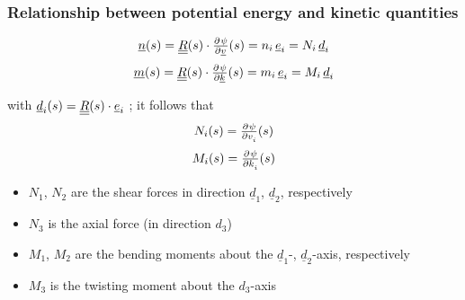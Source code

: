 \begin{frame}
  \frametitle{Relationship between potential energy and kinetic quantities}
 
  \begin{displaymath}
    \underline{n}(s) = \doubleunderline{R}(s) \cdot \pd{\psi}{\underline{v}}(s) =
    n_i \, \underline{e}_i = N_i \, \underline{d}_i
  \end{displaymath}
  \begin{displaymath}
    \underline{m}(s) = \doubleunderline{R}(s) \cdot \pd{\psi}{\underline{k}}(s) =
    m_i \, \underline{e}_i = M_i \, \underline{d}_i
  \end{displaymath}
  
  with $\underline{d}_i(s) = \underline{\underline{R}}(s) \cdot \underline{e}_i$ ; it follows that
  \begin{displaymath}
    N_i(s) = \pd{\psi}{v_i}(s)
  \end{displaymath}
  \begin{displaymath}
    M_i(s) = \pd{\psi}{k_i}(s)
  \end{displaymath}
  
  \vspace{0.5em}
  \begin{itemize}
    \item $N_1$, $N_2$ are the shear forces in direction $\underline{d}_1$, $\underline{d}_2$, respectively
    \item $N_3$ is the axial force (in direction $d_3$)
    \item $M_1$, $M_2$ are the bending moments about the $\underline{d}_1$-, $\underline{d}_2$-axis, respectively
    \item $M_3$ is the twisting moment about the $d_3$-axis
  \end{itemize}
\end{frame}

